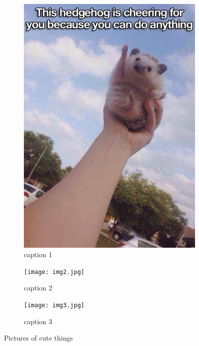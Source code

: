 \documentclass[12pt]{article}
\begin{document}
\begin{figure}[H]
    \centering
    \begin{subfigure}[b]{0.3\textwidth}
        \includegraphics[width=\textwidth]{img1.jpg}
        \caption{caption 1}
    \end{subfigure}
    \begin{subfigure}[b]{0.3\textwidth}
        \texttt{[image: img2.jpg]}
        \caption{caption 2}
    \end{subfigure}
    \begin{subfigure}[b]{0.3\textwidth}
        \texttt{[image: img3.jpg]}
        \caption{caption 3}
    \end{subfigure}
    \caption{Pictures of cute things}
\end{figure}
\end{document}
